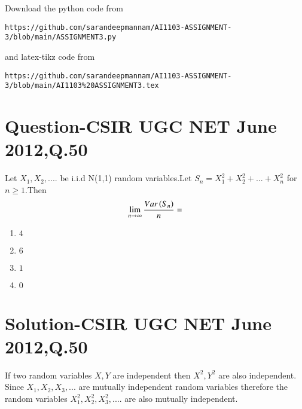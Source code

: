 \documentclass[journal,12pt,twocolumn]{IEEEtran}
\begin{document}
Download the python code from 
\begin{lstlisting}
https://github.com/sarandeepmannam/AI1103-ASSIGNMENT-3/blob/main/ASSIGNMENT3.py
\end{lstlisting}
%
and latex-tikz code from 
%
\begin{lstlisting}
https://github.com/sarandeepmannam/AI1103-ASSIGNMENT-3/blob/main/AI1103%20ASSIGNMENT3.tex
\end{lstlisting}
\section{Question-CSIR UGC NET June 2012,Q.50}
Let $X_{1},X_{2},....$ be i.i.d N(1,1) random variables.Let $S_{n}=X_{1}^{2}+X_{2}^2+...+X_{n}^{2}$ for $n\ge1$.Then $$\lim_{n \to \infty}{\frac{Var\left(S_{n}\right)}{n}}=$$
\begin{enumerate}[label = (\Alph*)]
\item  $4$
\item  $6$
\item  $1$
\item  $0$
\end{enumerate}

\section{Solution-CSIR UGC NET June 2012,Q.50}

If two random variables $X,Y$ are independent then $X^2,Y^2$ are also independent.
Since $X_{1},X_{2},X_{3},...$ are mutually independent random variables therefore the random variables $X_{1}^{2},X_{2}^{2},X_{3}^{2},....$  are also mutually independent.
\end{document}
